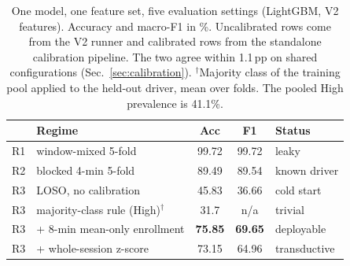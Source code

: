 \documentclass[journal]{IEEEtran}
\newcommand{\pp}{\,pp}
\newcommand{\rone}{R1}
\newcommand{\rtwo}{R2}
\newcommand{\rthree}{R3}
\begin{document}
\begin{table}[!t]
\caption{One model, one feature set, five evaluation settings (LightGBM, V2
features). Accuracy and macro-F1 in \%. Uncalibrated rows come from the V2
runner and calibrated rows from the standalone calibration pipeline. The two
agree within 1.1\pp{} on shared configurations (Sec.~\ref{sec:calibration}).
$^{\dagger}$Majority class of the training pool applied to the held-out
driver, mean over folds. The pooled High prevalence is 41.1\%.}
\label{tab:ladder}
\centering\footnotesize
\begin{tabular}{@{}llccl@{}}
\toprule
 & Regime & Acc & F1 & Status \\
\midrule
\rone   & window-mixed 5-fold           & 99.72 & 99.72 & leaky \\
\rtwo   & blocked 4-min 5-fold          & 89.49 & 89.54 & known driver \\
\rthree & LOSO, no calibration          & 45.83 & 36.66 & cold start \\
\rthree & majority-class rule (High)$^{\dagger}$ & 31.7  & n/a   & trivial \\
\rthree & + 8-min mean-only enrollment  & \textbf{75.85} & \textbf{69.65} & deployable \\
\rthree & + whole-session z-score       & 73.15 & 64.96 & transductive \\
\bottomrule
\end{tabular}
\end{table}
\end{document}

